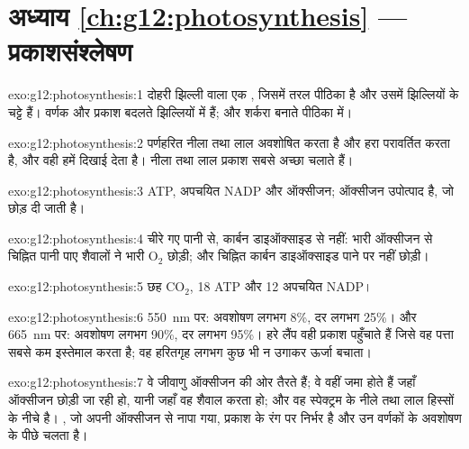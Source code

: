 \section*{अध्याय \ref{ch:g12:photosynthesis} --- प्रकाशसंश्लेषण}

\begin{solution}{exo:g12:photosynthesis:1}
दोहरी झिल्ली वाला एक , जिसमें तरल पीठिका है और उसमें 
झिल्लियों के चट्टे हैं। वर्णक और प्रकाश बदलते   झिल्लियों
में हैं; और शर्करा बनाते  पीठिका में।
\end{solution}

\begin{solution}{exo:g12:photosynthesis:2}
पर्णहरित नीला तथा लाल अवशोषित करता है और हरा परावर्तित करता है, और वही हमें
दिखाई देता है। नीला तथा लाल प्रकाश  सबसे अच्छा चलाते हैं।
\end{solution}

\begin{solution}{exo:g12:photosynthesis:3}
ATP, अपचयित NADP और ऑक्सीजन; ऑक्सीजन उपोत्पाद है, जो छोड़ दी जाती है।
\end{solution}

\begin{solution}{exo:g12:photosynthesis:4}
चीरे गए पानी से, कार्बन डाइऑक्साइड से नहीं: भारी ऑक्सीजन से चिह्नित पानी
पाए शैवालों ने भारी $\mathrm{O_2}$ छोड़ी; और चिह्नित कार्बन डाइऑक्साइड पाने
पर नहीं छोड़ी।
\end{solution}

\begin{solution}{exo:g12:photosynthesis:5}
छह $\mathrm{CO_2}$, 18 ATP और 12 अपचयित NADP।
\end{solution}

\begin{solution}{exo:g12:photosynthesis:6}
\qty{550}{nm} पर: अवशोषण लगभग 8\%, दर लगभग 25\%। और \qty{665}{nm} पर:
अवशोषण लगभग 90\%, दर लगभग 95\%। हरे लैंप वही प्रकाश पहुँचाते हैं जिसे वह
पत्ता सबसे कम इस्तेमाल करता है; वह हरितगृह लगभग कुछ भी न उगाकर ऊर्जा बचाता।
\end{solution}

\begin{solution}{exo:g12:photosynthesis:7}
वे जीवाणु ऑक्सीजन की ओर तैरते हैं; वे वहीं जमा होते हैं जहाँ ऑक्सीजन छोड़ी
जा रही हो, यानी जहाँ वह शैवाल  करता हो; और वह स्पेक्ट्रम के
नीले तथा लाल हिस्सों के नीचे है। , जो अपनी ऑक्सीजन से नापा
गया, प्रकाश के रंग पर निर्भर है और उन वर्णकों के अवशोषण के पीछे चलता है।
\end{solution}

